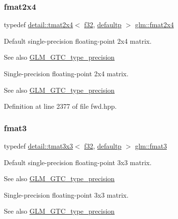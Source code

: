 \subsubsection{\texorpdfstring{fmat2x4}{fmat2x4}}
{\footnotesize\ttfamily typedef \hyperlink{structglm_1_1detail_1_1tmat2x4}{detail\+::tmat2x4}$<$ \hyperlink{group__gtc__type__precision_ga0ec999b57f5330d9021256e96038df04}{f32}, \hyperlink{namespaceglm_a0f04f086094c747d227af4425893f545a9d21ccd8b5a009ec7eb7677befc3bf51}{defaultp} $>$ \hyperlink{group__gtc__type__precision_gaf3af7a2f10aaf8028a95b7232b24d84e}{glm\+::fmat2x4}}

Default single-\/precision floating-\/point 2x4 matrix. \begin{DoxySeeAlso}{See also}
\hyperlink{group__gtc__type__precision}{G\+L\+M\+\_\+\+G\+T\+C\+\_\+type\+\_\+precision}
\end{DoxySeeAlso}
Single-\/precision floating-\/point 2x4 matrix. \begin{DoxySeeAlso}{See also}
\hyperlink{group__gtc__type__precision}{G\+L\+M\+\_\+\+G\+T\+C\+\_\+type\+\_\+precision} 
\end{DoxySeeAlso}


Definition at line 2377 of file fwd.\+hpp.

\mbox{\label{group__gtc__type__precision_gaa7b09502b183884aca53338c35b09509}} 
\subsubsection{\texorpdfstring{fmat3}{fmat3}}
{\footnotesize\ttfamily typedef \hyperlink{structglm_1_1detail_1_1tmat3x3}{detail\+::tmat3x3}$<$ \hyperlink{group__gtc__type__precision_ga0ec999b57f5330d9021256e96038df04}{f32}, \hyperlink{namespaceglm_a0f04f086094c747d227af4425893f545a9d21ccd8b5a009ec7eb7677befc3bf51}{defaultp} $>$ \hyperlink{group__gtc__type__precision_gaa7b09502b183884aca53338c35b09509}{glm\+::fmat3}}

Default single-\/precision floating-\/point 3x3 matrix. \begin{DoxySeeAlso}{See also}
\hyperlink{group__gtc__type__precision}{G\+L\+M\+\_\+\+G\+T\+C\+\_\+type\+\_\+precision}
\end{DoxySeeAlso}
Single-\/precision floating-\/point 3x3 matrix. \begin{DoxySeeAlso}{See also}
\hyperlink{group__gtc__type__precision}{G\+L\+M\+\_\+\+G\+T\+C\+\_\+type\+\_\+precision} 
\end{DoxySeeAlso}



